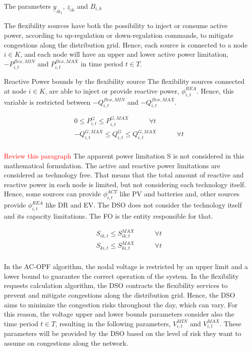 The parameters $\underline{y}_{ik_1}$,  $\underline{z}_{ik}$ and $B_{i,k}$

The flexibility sources have both the possibility to inject or consume active power, according to up-regulation or down-regulation commands, to mitigate congestions along the distribution grid. Hence, each source is connected to a node $i \in K$, and each node will have an upper and lower active power limitation, $-P_{i,t}^{flex,MIN}$ and $P_{i,t}^{flex,MAX}$  in time period $t \in T$.

Reactive Power bounds by the flexibility source
The flexibility sources connected at node $i \in K$, are able to inject or provide reactive power, $\phi_{i,t}^{REA}$. Hence, this variable is restricted between $-Q_{i,t}^{flex,MIN}$ and $-Q_{i,t}^{flex,MAX}$.

\begin{subequations}
\begin{align*}
&  0 \leq P_{i,t}^{G} \leq P_{i,t}^{G,MAX}  \quad   \qquad  \forall t  \\
&  - Q_{i,t}^{G,MAX} \leq Q_{i,t}^{G} \leq Q_{i,t}^{G,MAX}  \quad   \qquad  \forall t \\
\end{align*}
\end{subequations}

\textcolor{red}{Review this paragraph}
The apparent power limitation S is not considered in this mathematical formulation. The active and reactive power limitations are considered as technology free. That means that the total amount of reactive and reactive power in each node is limited, but not considering each technology itself. Hence, some sources can provide $\phi_{i,t}^{ACT}$ like PV and  batteries and, other sources provide $\phi_{i,t}^{REA}$ like DR and EV. The DSO does not consider the technology itself and its capacity limitations. The FO is the entity  responsible for that. 

\begin{subequations}
\begin{align*}
&  S_{ik,t} \leq S_{ik,t}^{MAX}  \quad   \qquad  \forall t  \\
&  S_{ki,t} \leq S_{ki,t}^{MAX}  \quad   \qquad  \forall t  \\ 
\end{align*}
\end{subequations}

In the AC-OPF algorithm, the nodal voltage is restricted by an upper limit and a lower bound to guarantee the correct operation of the system. In the flexibility requests calculation algorithm, the DSO contracts the flexibility services to prevent and mitigate congestions along the distribution grid. Hence, the DSO aims to minimize the congestion risks throughout the day, which can vary. For this reason, the voltage upper and lower bounds parameters consider also the time period $t \in T$, resulting in the following parameters, $V_{i,t}^{MIN}$ and $V_{i,t}^{MAX}$. These parameters will be provided by the DSO based on the level of risk they want to assume on congestions along the network.

